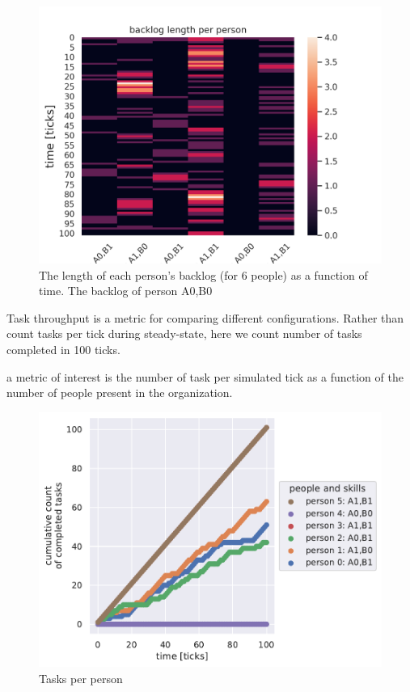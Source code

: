 \begin{figure}
\centering
\includegraphics{images/task_distribution_backlog_length_per_person_simCount1_skills2_levels1_taskduration1_people6_social0_ticks100.png}
\caption{The length of each person's backlog (for 6 people) as a function of time. The backlog of person A0,B0}
\label{fig:task-distribution-backlog-length}
\end{figure}


Task throughput is a metric for comparing different configurations. Rather than count tasks per tick during steady-state, here we count number of tasks completed in 100 ticks. 

a metric of interest is the number of task per simulated tick as a function of the number of people present in the organization.


\begin{figure}
\centering
\includegraphics{images/task_distribution_tasks_per_person_simCount1_skills2_levels1_taskduration1_people6_social0_ticks100.pdf}
\caption{Tasks per person}
\label{fig:task-distribution-tasks-per-person}
\end{figure}

